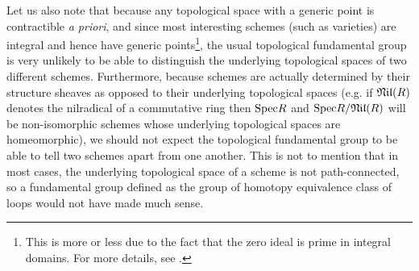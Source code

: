             Let us also note that because any topological space with a generic point is contractible \textit{a priori}, and since most interesting schemes (such as varieties) are integral and hence have generic points\footnote{This is more or less due to the fact that the zero ideal is prime in integral domains. For more details, see \cite[\href{https://stacks.math.columbia.edu/tag/01IS}{Tag 01IS}]{stacks-project}.}, the usual topological fundamental group is very unlikely to be able to distinguish the underlying topological spaces of two different schemes. Furthermore, because schemes are actually determined by their structure sheaves as opposed to their underlying topological spaces (e.g. if $\mathfrak{Nil}(R)$ denotes the nilradical of a commutative ring then $\mathrm{Spec} R$ and $\mathrm{Spec} R/\mathfrak{Nil}(R)$ will be non-isomorphic schemes whose underlying topological spaces are homeomorphic), we should not expect the topological fundamental group to be able to tell two schemes apart from one another. This is not to mention that in most cases, the underlying topological space of a scheme is not path-connected, so a fundamental group defined as the group of homotopy equivalence class of loops would not have made much sense.
